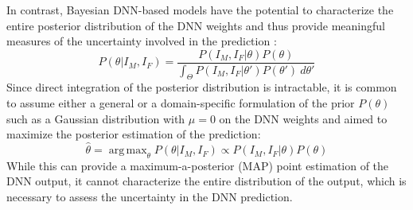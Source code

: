 \documentclass[preprint,authoryear]{elsarticle}
\DeclareMathOperator*{\argmax}{arg\,max}
\begin{document}
In contrast, Bayesian DNN-based models have the potential to characterize the entire posterior distribution of the DNN weights and thus provide meaningful measures of the uncertainty involved in the prediction \cite{neal2012bayesian,cheng2019bayesian}:
\begin{equation}
    P(\theta|I_M,I_F) = \frac{P(I_M,I_F|\theta)P(\theta)}{\int_\Theta P(I_M,I_F|\theta')P(\theta')\:d\theta'} 
\end{equation}
Since direct integration of the posterior distribution is intractable, it is common to assume either a general or a domain-specific formulation of the prior $P(\theta)$ such as a Gaussian distribution with $\mu=0$ on the DNN weights and aimed to maximize the posterior estimation of the prediction:
\begin{equation}
\hat{\theta}= \argmax_\theta {P\left(\theta|I_M,I_F\right) \propto P(I_M,I_F|\theta)P(\theta)} \label{eq:basreg}
\end{equation} 
While this can provide a maximum-a-posterior (MAP) point estimation of the DNN output, it cannot characterize the entire distribution of the output, which is necessary to assess the uncertainty in the DNN prediction. 
\end{document}
